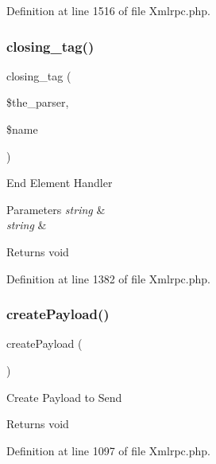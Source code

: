 Definition at line 1516 of file Xmlrpc.\+php.

\mbox{\label{class_x_m_l___r_p_c___message_a6f0fbd9812fbf30516fa22d5743d9e89}} 
\subsubsection{\texorpdfstring{closing\_tag()}{closing\_tag()}}
{\footnotesize\ttfamily closing\+\_\+tag (\begin{DoxyParamCaption}\item[{}]{\$the\+\_\+parser,  }\item[{}]{\$name }\end{DoxyParamCaption})}

End Element Handler


\begin{DoxyParams}{Parameters}
{\em string} & \\
\hline
{\em string} & \\
\hline
\end{DoxyParams}
\begin{DoxyReturn}{Returns}
void 
\end{DoxyReturn}


Definition at line 1382 of file Xmlrpc.\+php.

\mbox{\label{class_x_m_l___r_p_c___message_a9db0a53d149ebbb907ef60a27bbc9f1c}} 
\subsubsection{\texorpdfstring{createPayload()}{createPayload()}}
{\footnotesize\ttfamily create\+Payload (\begin{DoxyParamCaption}{ }\end{DoxyParamCaption})}

Create Payload to Send

\begin{DoxyReturn}{Returns}
void 
\end{DoxyReturn}


Definition at line 1097 of file Xmlrpc.\+php.

